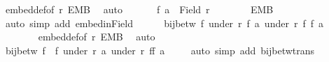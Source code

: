 \begin{isabellebody}
\ embed{\isacharunderscore}{\kern0pt}def{\isacharbrackleft}{\kern0pt}of\ r{\isacharbrackright}{\kern0pt}\ EMB\ \isamarkupfalse%
\ auto\isanewline
\ \ \isamarkupfalse%
\isanewline
\ \ \isacommand{{\isacharbraceleft}{\kern0pt}}\isamarkupfalse%
\isamarkupfalse%
\ {\isachardoublequoteopen}f\ a\ {\isasymin}\ Field\ r{\isacharprime}{\kern0pt}{\isachardoublequoteclose}\isanewline
\ \ \ \ \ \ \isamarkupfalse%
\ EMB\ {\isacharasterisk}{\kern0pt}\ \isamarkupfalse%
\ {\isacharparenleft}{\kern0pt}auto\ simp\ add{\isacharcolon}{\kern0pt}\ embed{\isacharunderscore}{\kern0pt}in{\isacharunderscore}{\kern0pt}Field{\isacharparenright}{\kern0pt}\isanewline
\ \ \ \ \isamarkupfalse%
\ {\isachardoublequoteopen}bij{\isacharunderscore}{\kern0pt}betw\ f{\isacharprime}{\kern0pt}\ {\isacharparenleft}{\kern0pt}under\ r{\isacharprime}{\kern0pt}\ {\isacharparenleft}{\kern0pt}f\ a{\isacharparenright}{\kern0pt}{\isacharparenright}{\kern0pt}\ {\isacharparenleft}{\kern0pt}under\ r{\isacharprime}{\kern0pt}{\isacharprime}{\kern0pt}\ {\isacharparenleft}{\kern0pt}f{\isacharprime}{\kern0pt}\ {\isacharparenleft}{\kern0pt}f\ a{\isacharparenright}{\kern0pt}{\isacharparenright}{\kern0pt}{\isacharparenright}{\kern0pt}{\isachardoublequoteclose}\isanewline
\ \ \ \ \ \ \isamarkupfalse%
\ embed{\isacharunderscore}{\kern0pt}def{\isacharbrackleft}{\kern0pt}of\ r{\isacharprime}{\kern0pt}{\isacharbrackright}{\kern0pt}\ EMB{\isacharprime}{\kern0pt}\ \isamarkupfalse%
\ auto\isanewline
\ \ \isacommand{{\isacharbraceright}{\kern0pt}}\isamarkupfalse%
\isanewline
\ \ \isamarkupfalse%
\isanewline
\ \ \isamarkupfalse%
\ {\isachardoublequoteopen}bij{\isacharunderscore}{\kern0pt}betw\ {\isacharparenleft}{\kern0pt}f{\isacharprime}{\kern0pt}\ {\isasymcirc}\ f{\isacharparenright}{\kern0pt}\ {\isacharparenleft}{\kern0pt}under\ r\ a{\isacharparenright}{\kern0pt}\ {\isacharparenleft}{\kern0pt}under\ r{\isacharprime}{\kern0pt}{\isacharprime}{\kern0pt}\ {\isacharparenleft}{\kern0pt}f{\isacharprime}{\kern0pt}{\isacharparenleft}{\kern0pt}f\ a{\isacharparenright}{\kern0pt}{\isacharparenright}{\kern0pt}{\isacharparenright}{\kern0pt}{\isachardoublequoteclose}\isanewline
\ \ \ \ \isamarkupfalse%
{\isacharparenleft}{\kern0pt}auto\ simp\ add{\isacharcolon}{\kern0pt}\ bij{\isacharunderscore}{\kern0pt}betw{\isacharunderscore}{\kern0pt}trans{\isacharparenright}{\kern0pt}\isanewline
{}\isamarkupfalse%
%
\endisatagproof
{\isafoldproof}%

\end{isabellebody}
